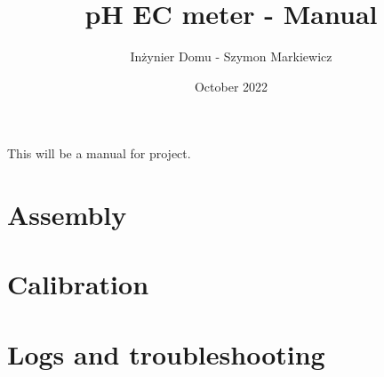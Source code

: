 \documentclass{article}
\title{pH EC meter - Manual}
\author{Inżynier Domu - Szymon Markiewicz}
\date{October 2022}
\begin{document}
\maketitle
\tableofcontents

This will be a manual for project.

\section{Assembly}
\section{Calibration}
\section{Logs and troubleshooting}
\end{document}

